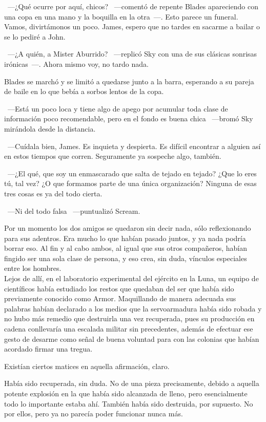 ~---¿Qué ocurre por aquí, chicos? ~---comentó de repente Blades apareciendo con una copa en una mano y la boquilla en la otra~---. Esto parece un funeral. Vamos, divirtámonos un poco. James, espero que no tardes en sacarme a bailar o se lo pediré a John.

~---¿A quién, a Mister Aburrido? ~---replicó Sky con una de sus clásicas sonrisas irónicas~---. Ahora mismo voy, no tardo nada.

Blades se marchó y se limitó a quedarse junto a la barra, esperando a su pareja de baile en lo que bebía a sorbos lentos de la copa.

~---Está un poco loca y tiene algo de apego por acumular toda clase de información poco recomendable, pero en el fondo es buena chica ~---bromó Sky mirándola desde la distancia.

~---Cuídala bien, James. Es inquieta y despierta. Es difícil encontrar a alguien así en estos tiempos que corren. Seguramente ya sospeche algo, también.

~---¿El qué, que soy un enmascarado que salta de tejado en tejado? ¿Que lo eres tú, tal vez? ¿O que formamos parte de una única organización? Ninguna de esas tres cosas es ya del todo cierta.

~---Ni del todo falsa ~---puntualizó Scream.

Por un momento los dos amigos se quedaron sin decir nada, sólo reflexionando para sus adentros. Era mucho lo que habían pasado juntos, y ya nada podría borrar eso. Al fin y al cabo ambos, al igual que sus otros compañeros, habían fingido ser una sola clase de persona, y eso crea, sin duda, vínculos especiales entre los hombres.\\

\noindent{}Lejos de allí, en el laboratorio experimental del ejército en la Luna, un equipo de científicos había estudiado los restos que quedaban del ser que había sido previamente conocido como Armor. Maquillando de manera adecuada sus palabras habían declarado a los medios que la servoarmadura había sido robada y no hubo más remedio que destruirla una vez recuperada, pues su producción en cadena conllevaría una escalada militar sin precedentes, además de efectuar ese gesto de desarme como señal de buena voluntad para con las colonias que habían acordado firmar una tregua.

Existían ciertos matices en aquella afirmación, claro.

Había sido recuperada, sin duda. No de una pieza precisamente, debido a aquella potente explosión en la que había sido alcanzada de lleno, pero esencialmente todo lo importante estaba ahí. También había sido destruida, por supuesto. No por ellos, pero ya no parecía poder funcionar nunca más.

